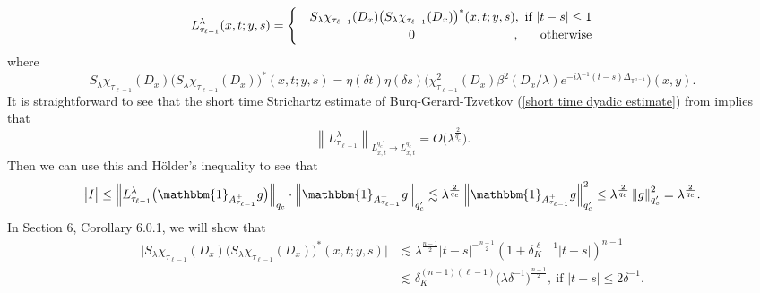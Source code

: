 \documentclass[11pt]{amsart}
\numberwithin{equation}{section}
\newcommand{\Tn}{\mathbb{T}^{n-1}}
\newcommand{\la}{\lambda}
\newcommand\norm[1]{\left\lVert#1\right\rVert}
\newcommand{\Lpopnormalt}[5]{\norm{#1}_{L^{#2}_{#3} \to L^{#4}_{#5} }}
\newcommand{\lpn}[2]{\norm{#1}_{#2}}
\newcommand{\laplac}[1]{\Delta_{#1}}
\newcommand{\Sl}{S_{\la}}
\newcommand{\dK}[1]{\delta_{K}^{#1}}
\begin{document}
\begin{equation} \label{large height local kernel I}
    L_{\tau_{\ell - 1}}^{\la}(x,t;y,s) = \\
    { \begin{cases} 

    &\Sl \chi_{\tau_{\ell - 1}}(D_x)\big(\Sl \chi_{\tau_{\ell - 1}}(D_x)\big)^{*}(x,t;y,s), \ \text{if } |t-s| \leq 1 \\ 
    
    & \hfill 0 \hfill, \ \ \ \ \ \text{otherwise} 

    \end{cases} 
}
\end{equation}
where
\begin{equation} \label{large height local kernel II}
    \Sl \chi_{\tau_{\ell - 1}}(D_x)\big(\Sl \chi_{\tau_{\ell - 1}}(D_x)\big)^{*}(x,t;y,s) = \eta(\delta t)\eta(\delta s)\big(\chi_{\tau_{\ell - 1}}^2(D_x)\beta^2(D_x/\la)e^{-i\la^{-1}(t-s)\laplac{\Tn}}\big)(x,y).
\end{equation}
It is straightforward to see that the short time Strichartz estimate of Burq-Gerard-Tzvetkov (\ref{short time dyadic estimate}) from \cite{bgtstrichartzmanifold} implies that
\begin{equation}
    \Lpopnormalt{L_{\tau_{\ell -1}}^{\la}}{q_c'}{x,t}{q_c}{x,t} = O\big(\la^{\frac{2}{q_c}}\big).
\end{equation}
Then we can use this and H\"{o}lder's inequality to see that 
\begin{equation} \label{large height 1st term estimate}
        \big| I \big| \leq \lpn{L_{\tau_{\ell - 1}}^{\la}\big( \mathbbm{1}_{A^{+}_{\tau_{\ell - 1}}}g\big)}{q_c} \cdot \lpn{\mathbbm{1}_{A^{+}_{\tau_{\ell - 1}}}g}{q_c'} \lesssim \la^{\frac{2}{q_c}} \lpn{\mathbbm{1}_{A^{+}_{\tau_{\ell - 1}}}g}{q_c'}^2 \leq \la^{\frac{2}{q_c}}\lpn{g}{q_c'}^2 = \la^{\frac{2}{q_c}}.
\end{equation}
In Section 6, Corollary 6.0.1, we will show that 
\begin{equation} \label{kernel estimate for large heights}
\begin{split}
    \big| \Sl \chi_{\tau_{\ell - 1}}(D_x) \big(\Sl \chi_{\tau_{\ell - 1}}(D_x)\big)^*(x,t;y,s) \big| &\lesssim  \la^{\frac{n-1}{2}}|t-s|^{-\frac{n-1}{2}}(1+\dK{\ell-1}|t-s|)^{n-1}\\
    & \lesssim \delta_{K}^{(n-1)(\ell-1)} \big(\la \delta^{-1}\big)^{\frac{n-1}{2}}, \ \text{if } |t-s| \leq 2\delta^{-1}.
\end{split}
\end{equation}
\end{document}
